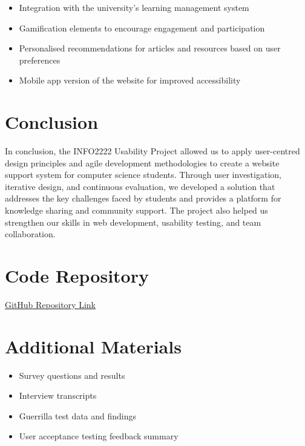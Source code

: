 \documentclass[12pt]{article}
\begin{document}
\begin{itemize}
    \item Integration with the university's learning management system
    \item Gamification elements to encourage engagement and participation
    \item Personalised recommendations for articles and resources based on user preferences
    \item Mobile app version of the website for improved accessibility
\end{itemize}

\newpage
\section{Conclusion}
In conclusion, the INFO2222 Usability Project allowed us to apply user-centred design principles and agile development methodologies to create a website support system for computer science students. Through user investigation, iterative design, and continuous evaluation, we developed a solution that addresses the key challenges faced by students and provides a platform for knowledge sharing and community support. The project also helped us strengthen our skills in web development, usability testing, and team collaboration.

\appendix
\section{Code Repository}
\href{https://github.com/devanshimirchandani/INFO2222-A2-Usability}{GitHub Repository Link}

\section{Additional Materials}
\begin{itemize}
    \item Survey questions and results
    \item Interview transcripts
    \item Guerrilla test data and findings
    \item User acceptance testing feedback summary
\end{itemize}
\end{document}
